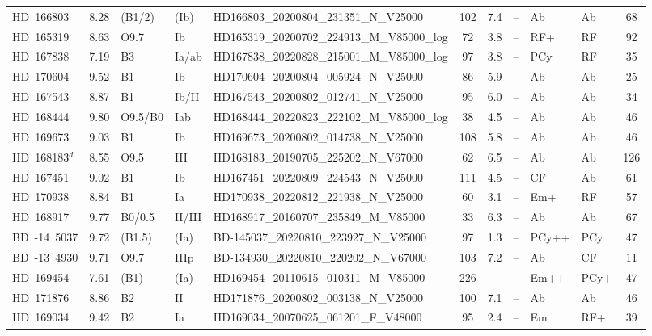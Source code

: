 {\begin{landscape}
\begin{longtable}{lclllcclllc}
\noalign{\smallskip}
HD~166803 & 8.28 & (B1/2) & (Ib) & HD166803\_20200804\_231351\_N\_V25000 & 102 & 7.4 & -- & Ab & Ab & 68 \\
\noalign{\smallskip}
HD~165319 & 8.63 & O9.7 & Ib & HD165319\_20200702\_224913\_M\_V85000\_log & 72 & 3.8 & -- & RF+ & RF & 92 \\
\noalign{\smallskip}
HD~167838 & 7.19 & B3 & Ia/ab & HD167838\_20220828\_215001\_M\_V85000\_log & 97 & 3.8 & -- & PCy & RF & 35 \\
\noalign{\smallskip}
HD~170604 & 9.52 & B1 & Ib & HD170604\_20200804\_005924\_N\_V25000 & 86 & 5.9 & -- & Ab & Ab & 25 \\
\noalign{\smallskip}
HD~167543 & 8.87 & B1 & Ib/II & HD167543\_20200802\_012741\_N\_V25000 & 95 & 6.0 & -- & Ab & Ab & 34 \\
\noalign{\smallskip}
HD~168444 & 9.80 & O9.5/B0 & Iab & HD168444\_20220823\_222102\_M\_V85000\_log & 38 & 4.5 & -- & Ab & Ab & 46 \\
\noalign{\smallskip}
HD~169673 & 9.03 & B1 & Ib & HD169673\_20200802\_014738\_N\_V25000 & 108 & 5.8 & -- & Ab & Ab & 46 \\
\noalign{\smallskip}
HD~168183$^{d}$ & 8.55 & O9.5 & III & HD168183\_20190705\_225202\_N\_V67000 & 62 & 6.5 & -- & Ab & Ab & 126 \\
\noalign{\smallskip}
HD~167451 & 9.02 & B1 & Ib & HD167451\_20220809\_224543\_N\_V25000 & 111 & 4.5 & -- & CF & Ab & 61 \\
\noalign{\smallskip}
HD~170938 & 8.84 & B1 & Ia & HD170938\_20220812\_221938\_N\_V25000 & 60 & 3.1 & -- & Em+ & RF & 57 \\
\noalign{\smallskip}
HD~168917 & 9.77 & B0/0.5 & II/III & HD168917\_20160707\_235849\_M\_V85000 & 33 & 6.3 & -- & Ab & Ab & 67 \\
\noalign{\smallskip}
BD~-14~5037 & 9.72 & (B1.5) & (Ia) & BD-145037\_20220810\_223927\_N\_V25000 & 97 & 1.3 & -- & PCy++ & PCy & 47 \\
\noalign{\smallskip}
BD~-13~4930 & 9.71 & O9.7 & IIIp & BD-134930\_20220810\_220202\_N\_V67000 & 103 & 7.2 & -- & Ab & CF & 11 \\
\noalign{\smallskip}
HD~169454 & 7.61 & (B1) & (Ia) & HD169454\_20110615\_010311\_M\_V85000 & 226 & -- & -- & Em++ & PCy+ & 47 \\
\noalign{\smallskip}
HD~171876 & 8.86 & B2 & II & HD171876\_20200802\_003138\_N\_V25000 & 100 & 7.1 & -- & Ab & Ab & 46 \\
\noalign{\smallskip}
HD~169034 & 9.42 & B2 & Ia & HD169034\_20070625\_061201\_F\_V48000 & 95 & 2.4 & -- & Em & RF+ & 39 \\

\end{longtable}
\end{landscape}}
